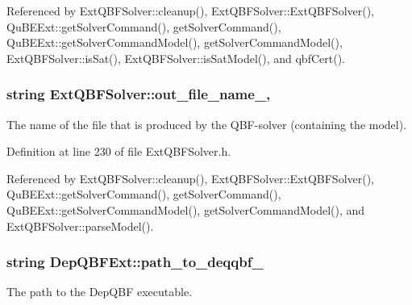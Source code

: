 Referenced by Ext\-Q\-B\-F\-Solver\-::cleanup(), Ext\-Q\-B\-F\-Solver\-::\-Ext\-Q\-B\-F\-Solver(), Qu\-B\-E\-Ext\-::get\-Solver\-Command(), get\-Solver\-Command(), Qu\-B\-E\-Ext\-::get\-Solver\-Command\-Model(), get\-Solver\-Command\-Model(), Ext\-Q\-B\-F\-Solver\-::is\-Sat(), Ext\-Q\-B\-F\-Solver\-::is\-Sat\-Model(), and qbf\-Cert().

\hypertarget{classExtQBFSolver_a0efb35aa9b807dec521ad3406eaf664d}{
\subsubsection[{out\-\_\-file\-\_\-name\-\_\-}]{\setlength{\rightskip}{0pt plus 5cm}string Ext\-Q\-B\-F\-Solver\-::out\-\_\-file\-\_\-name\-\_\-\hspace{0.3cm}{\ttfamily [protected]}, {\ttfamily [inherited]}}}\label{classExtQBFSolver_a0efb35aa9b807dec521ad3406eaf664d}


The name of the file that is produced by the Q\-B\-F-\/solver (containing the model). 



Definition at line 230 of file Ext\-Q\-B\-F\-Solver.\-h.



Referenced by Ext\-Q\-B\-F\-Solver\-::cleanup(), Ext\-Q\-B\-F\-Solver\-::\-Ext\-Q\-B\-F\-Solver(), Qu\-B\-E\-Ext\-::get\-Solver\-Command(), get\-Solver\-Command(), Qu\-B\-E\-Ext\-::get\-Solver\-Command\-Model(), get\-Solver\-Command\-Model(), and Ext\-Q\-B\-F\-Solver\-::parse\-Model().

\hypertarget{classDepQBFExt_a4c952a6d69e93efc5cd6c5491f85c5b3}{
\subsubsection[{path\-\_\-to\-\_\-deqqbf\-\_\-}]{\setlength{\rightskip}{0pt plus 5cm}string Dep\-Q\-B\-F\-Ext\-::path\-\_\-to\-\_\-deqqbf\-\_\-\hspace{0.3cm}{\ttfamily [protected]}}}\label{classDepQBFExt_a4c952a6d69e93efc5cd6c5491f85c5b3}


The path to the Dep\-Q\-B\-F executable. 



